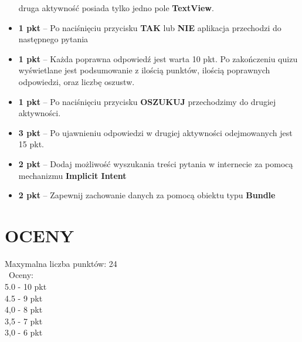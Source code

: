 \documentclass[a4paper]{article}
\begin{document}
\begin{itemize}
druga aktywność posiada tylko jedno pole \textbf{TextView}.

\item \textbf{1 pkt} -- Po naciśnięciu przycisku \textbf{TAK} lub \textbf{NIE} aplikacja przechodzi do następnego pytania

\item \textbf{1 pkt} -- Każda poprawna odpowiedź jest warta 10 pkt. Po zakończeniu quizu wyświetlane jest podsumowanie z ilością punktów, ilością poprawnych odpowiedzi, oraz liczbę oszustw.

\item \textbf{1 pkt} -- Po naciśnięciu przycisku \textbf{OSZUKUJ} przechodzimy do drugiej aktywności.

\item \textbf{3 pkt} -- Po ujawnieniu odpowiedzi w drugiej aktywności odejmowanych jest 15 pkt.

\item \textbf{2 pkt} -- Dodaj możliwość wyszukania treści pytania w internecie za pomocą mechanizmu \textbf{Implicit Intent}

\item \textbf{2 pkt} -- Zapewnij zachowanie danych za pomocą obiektu typu \textbf{Bundle}
\end{itemize}

\section*{OCENY}
Maxymalna liczba punktów: 24\\\
Oceny:\\
5.0 - 10 pkt\\
4.5 - 9 pkt\\
4,0 - 8 pkt\\
3,5 - 7 pkt\\
3,0 - 6 pkt
\end{document}
